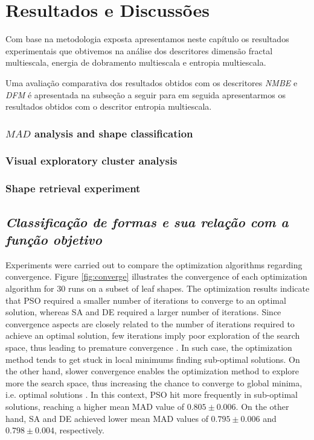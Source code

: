 
\chapter{Resultados e Discussões \label{chap:resultados}}

Com base na metodologia exposta apresentamos neste capítulo os resultados experimentais que obtivemos na análise dos descritores dimensão fractal multiescala, energia de dobramento multiescala e entropia  multiescala.

Uma avaliação comparativa dos resultados obtidos com os descritores \emph{NMBE} e \emph{DFM} é apresentada na subseção a seguir para em seguida apresentarmos os resultados obtidos com o descritor entropia multiescala.

{\color{blue}
\subsection{$MAD$ analysis and shape classification \label{sec:mad_class}}

\subsection{Visual exploratory cluster analysis}


\subsection{Shape retrieval experiment}


{\color{red}

\section{\emph{Classificação de formas e sua relação com  a função objetivo}}
Experiments were carried out to compare the optimization algorithms regarding convergence.  Figure \ref{fig:converge} illustrates the convergence of each optimization algorithm for $30$ runs on a subset of leaf shapes. 
The optimization results indicate that PSO required a smaller number of iterations to converge to an optimal solution, whereas SA and DE required a larger number of iterations. Since convergence aspects are closely related
to the number of iterations required to achieve an optimal solution, few iterations imply poor exploration of the search space, thus leading to premature convergence . In such case, the optimization method tends to get stuck in local minimums finding sub-optimal solutions. On the other hand, slower convergence enables the optimization method to explore more the search space, thus increasing the chance to converge to global minima, i.e. optimal solutions . 
In this context, PSO hit more frequently in sub-optimal solutions, reaching a higher mean MAD value of 
$0.805 \pm 0.006$. On the other hand, SA and DE achieved lower mean 
MAD values of $0.795 \pm 0.006$ and $0.798 \pm 0.004$, respectively. 

}}

